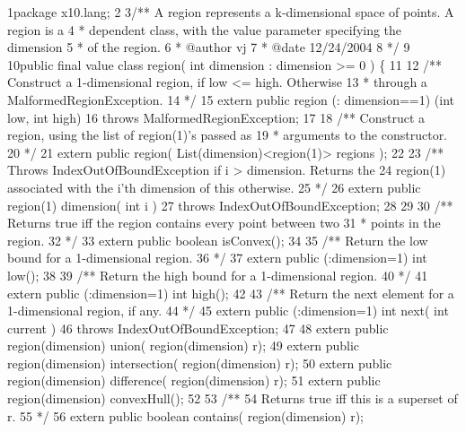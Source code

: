 \begin{tightcode}
\quad\num{1}package x10.lang;
\quad\num{2}
\quad\num{3}/** A region represents a k-dimensional space of points. A region is a
\quad\num{4} * dependent class, with the value parameter specifying the dimension
\quad\num{5} * of the region.
\quad\num{6} * @author vj
\quad\num{7} * @date 12/24/2004
\quad\num{8} */
\quad\num{9}
\quad\num{10}public final value class region( int dimension : dimension >= 0 )  \{
\quad\num{11}
\quad\num{12}    /** Construct a 1-dimensional region, if low <= high. Otherwise
\quad\num{13}     * through a MalformedRegionException.
\quad\num{14}     */
\quad\num{15}    extern public region (: dimension==1) (int low, int high)
\quad\num{16}        throws MalformedRegionException;
\quad\num{17}
\quad\num{18}    /** Construct a region, using the list of region(1)'s passed as
\quad\num{19}     * arguments to the constructor.
\quad\num{20}     */
\quad\num{21}    extern public region( List(dimension)<region(1)> regions );
\quad\num{22}
\quad\num{23}    /** Throws IndexOutOfBoundException if i > dimension. Returns the
\quad\num{24}        region(1) associated with the i'th dimension of this otherwise.
\quad\num{25}     */
\quad\num{26}    extern public region(1) dimension( int i )
\quad\num{27}        throws IndexOutOfBoundException;
\quad\num{28}
\quad\num{29}
\quad\num{30}    /** Returns true iff the region contains every point between two
\quad\num{31}     * points in the region.
\quad\num{32}     */
\quad\num{33}    extern public boolean isConvex();
\quad\num{34}
\quad\num{35}    /** Return the low bound for a 1-dimensional region.
\quad\num{36}     */
\quad\num{37}    extern public (:dimension=1) int low();
\quad\num{38}
\quad\num{39}    /** Return the high bound for a 1-dimensional region.
\quad\num{40}     */
\quad\num{41}    extern public (:dimension=1) int high();
\quad\num{42}
\quad\num{43}    /** Return the next element for a 1-dimensional region, if any.
\quad\num{44}     */
\quad\num{45}    extern public (:dimension=1) int next( int current )
\quad\num{46}        throws IndexOutOfBoundException;
\quad\num{47}
\quad\num{48}    extern public region(dimension) union( region(dimension) r);
\quad\num{49}    extern public region(dimension) intersection( region(dimension) r);
\quad\num{50}    extern public region(dimension) difference( region(dimension) r);
\quad\num{51}    extern public region(dimension) convexHull();
\quad\num{52}
\quad\num{53}    /**
\quad\num{54}       Returns true iff this is a superset of r.
\quad\num{55}     */
\quad\num{56}    extern public boolean contains( region(dimension) r);

\end{tightcode}
